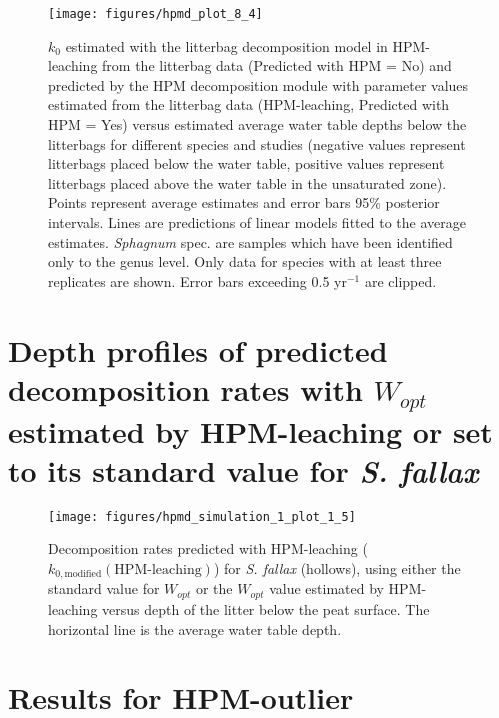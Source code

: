 \documentclass[
  12pt,
]{article}
\begin{document}
\begin{figure}[H]

{\centering \texttt{[image: figures/hpmd\_plot\_8\_4]} 

}

\caption{\(k_0\) estimated with the litterbag decomposition model in HPM-leaching from the litterbag data (Predicted with HPM = No) and predicted by the HPM decomposition module with parameter values estimated from the litterbag data (HPM-leaching, Predicted with HPM = Yes) versus estimated average water table depths below the litterbags for different species and studies (negative values represent litterbags placed below the water table, positive values represent litterbags placed above the water table in the unsaturated zone). Points represent average estimates and error bars 95\% posterior intervals. Lines are predictions of linear models fitted to the average estimates. \emph{Sphagnum} spec. are samples which have been identified only to the genus level. Only data for species with at least three replicates are shown. Error bars exceeding 0.5 yr\(^{-1}\) are clipped.}\label{fig:sup-hpmd-plot-8-4}
\end{figure}

\hypertarget{sup-9}{%
\section{\texorpdfstring{Depth profiles of predicted decomposition rates with \(W_{opt}\) estimated by HPM-leaching or set to its standard value for \emph{S. fallax}}{Depth profiles of predicted decomposition rates with W\_\{opt\} estimated by HPM-leaching or set to its standard value for S. fallax}}\label{sup-9}}



\begin{figure}[H]

{\centering \texttt{[image: figures/hpmd\_simulation\_1\_plot\_1\_5]} 

}

\caption{Decomposition rates predicted with HPM-leaching (\(k_{0,\text{modified}}(\text{HPM-leaching})\)) for \emph{S. fallax} (hollows), using either the standard value for \(W_{opt}\) or the \(W_{opt}\) value estimated by HPM-leaching versus depth of the litter below the peat surface. The horizontal line is the average water table depth.}\label{fig:sup-hpmd-simulation-1-plot-5}
\end{figure}

\hypertarget{sup-10}{%
\section{Results for HPM-outlier}\label{sup-10}}
\end{document}
